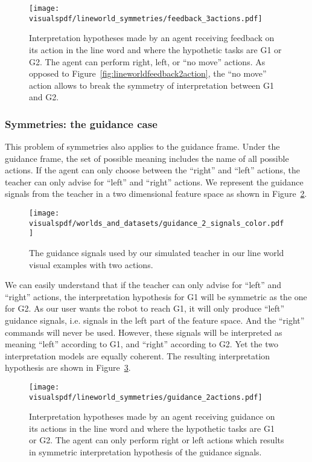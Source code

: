 \begin{figure}[!htbp]
  \centering
  \texttt{[image: \\visualspdf/lineworld\_symmetries/feedback\_3actions.pdf]}
  \caption{Interpretation hypotheses made by an agent receiving feedback on its action in the line word and where the hypothetic tasks are G1 or G2. The agent can perform right, left, or ``no move'' actions. As opposed to Figure~\ref{fig:lineworldfeedback2action}, the ``no move'' action allows to break the symmetry of interpretation between G1 and G2.}
  \label{fig:lineworldfeedback3action}
\end{figure}

\subsubsection*{Symmetries: the guidance case}

This problem of symmetries also applies to the guidance frame. Under the guidance frame, the set of possible meaning includes the name of all possible actions. If the agent can only choose between the ``right'' and ``left'' actions, the teacher can only advise for ``left'' and ``right'' actions. We represent the guidance signals from the teacher in a two dimensional feature space as shown in Figure~\ref{fig:lineworldguidance2signals}.

\begin{figure}[!htbp]
  \centering
  \texttt{[image: \\visualspdf/worlds\_and\_datasets/guidance\_2\_signals\_color.pdf]}
  \caption{The guidance signals used by our simulated teacher in our line world visual examples with two actions.}
  \label{fig:lineworldguidance2signals}
\end{figure}


We can easily understand that if the teacher can only advise for ``left'' and ``right'' actions, the interpretation hypothesis for G1 will be symmetric as the one for G2. As our user wants the robot to reach G1, it will only produce ``left'' guidance signals, i.e. signals in the left part of the feature space. And the ``right'' commands will never be used. However, these signals will be interpreted as meaning ``left'' according to G1, and ``right'' according to G2. Yet the two interpretation models are equally coherent. The resulting interpretation hypothesis are shown in Figure~\ref{fig:lineworldguidance2action}.

\begin{figure}[!htbp]
  \centering
  \texttt{[image: \\visualspdf/lineworld\_symmetries/guidance\_2actions.pdf]}
  \caption{Interpretation hypotheses made by an agent receiving guidance on its actions in the line word and where the hypothetic tasks are G1 or G2. The agent can only perform right or left actions which results in symmetric interpretation hypothesis of the guidance signals.}
  \label{fig:lineworldguidance2action}
\end{figure}

